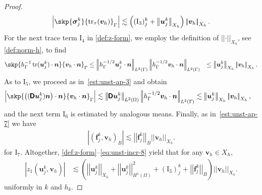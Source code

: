 \documentclass[reqno,a4paper]{amsart}
\def\abs#1{\left| #1 \right|}
\def\norm#1{\left|\!\left| #1 \right|\!\right|}
\def\tens#1{\pmb{\mathsf{#1}}}
\def\vec#1{\boldsymbol{#1}}
\def\tr{\mathop{\mathrm{tr}}\nolimits}
\def\bf{\vec{f}}
\def\bn{\vec{n}}
\def\bu{\vec{u}}
\def\bv{\vec{v}}
\def\bsigma{\vec{\sigma}}
\def\BD{\tens{D}}
\def\wz{{z_1}}
\begin{document}
\begin{proof}
		\begin{align}\label{eq:unst-incr-4}
			\abs{\skp{\bsigma^k_j}{\tr_{\tau}(\bv_h) }_{\Gamma}} 
			\lesssim 
			\left(  (\mathrm{I}_{3})^k_j +  \norm{\bu^k_j}_{X_h}  \right) 
			\norm{ \bv_h}_{X_h}. 
		\end{align}
	For the next trace term $\mathrm{I}_{4}$ in \eqref{def:z-form}, we employ the definition of $\norm{\cdot}_{X_h}$, see \eqref{def:norm-h}, to find
	\begin{equation}
		\begin{aligned}\label{eq:unst-incr-6}
			\skp{h_{\Gamma}^{-1} \tr(\bu^{k}_j) \cdot \bn}{\bv_h\cdot \bn }_{\Gamma}
			&\leq %
			\norm{h_{\Gamma}^{-1/2}\bu^k_j \cdot \bn}_{L^2(\Gamma)} \norm{h_{\Gamma}^{-1/2} \bv_h \cdot \bn}_{L^2(\Gamma)} 
			&
			\leq 
			\norm{ \bu^k_j}_{X_h}
			\norm{ \bv_h}_{X_h}.
		\end{aligned}
	\end{equation}
	As to $\mathrm{I}_{5}$, we proceed as in~\eqref{est:unst-ap-3} and obtain 
	\begin{equation}
		\begin{aligned}\label{eq:unst-incr-7}
			\abs{\skp{ \left( (
					\BD \bu_j^{k}) \bn \right) \cdot \bn }{ \bv_h \cdot \bn }_{\Gamma} } 
			& \lesssim  
			\norm{ \BD \bu_j^{k} }_{L^2(\Omega)}
			\norm{h_{\Gamma}^{-1/2} \bv_h \cdot \bn }_{L^2(\Gamma)}
			\lesssim   
			\norm{ \bu_j^{k} }_{X_h}
			\norm{ \bv_h}_{X_h},
		\end{aligned}
	\end{equation}
	and the next term $\mathrm{I}_{6}$ is estimated by analogous means. 
	Finally, as in~\eqref{est:unst-ap-7} we have 
	\begin{equation}
		\begin{aligned}\label{eq:unst-incr-8}
			\abs{({\bf}_j^{k} ,{\bv}_h )_B } 
			\lesssim  
			\norm{{\bf}_j^{k} }_{B}
			\norm{\bv_h}_{X_h}. 
		\end{aligned}
	\end{equation}
	for $\mathrm{I}_{7}$. 
	Altogether, \eqref{def:z-form}--\eqref{eq:unst-incr-8} yield that for any $\bv_h \in X_h$,  
	\begin{equation}\label{eq:unst-est-2}
		\begin{aligned}
			\abs{\wz(\bu^k_j, \bv_h)} & \lesssim  
			\left( 
			\norm{ \bu_j^k}_{X_h} 
			+	
			\norm{\bu^k_j}_{H^1(\Omega)}^2 
			+ (\mathrm{I}_{3})^k_j
			+ \norm{{\bf}_j^{k} }_{B}
			\right) \norm{ \bv_h}_{X_h}. 
		\end{aligned}
	\end{equation}
	uniformly in $k$ and $h_k$. 
	

\end{proof}
\end{document}

